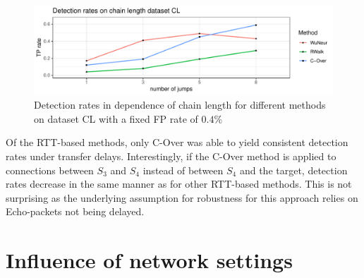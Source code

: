 \documentclass[runningheads,11pt]{llncs}\usepackage[]{graphicx}\usepackage[]{color}
\makeatletter
\def\maxwidth{ %
  \ifdim\Gin@nat@width>\linewidth
    \linewidth
  \else
    \Gin@nat@width
  \fi
}
\newenvironment{knitrout}{}{} %
\makeatother
\begin{document}
\begin{knitrout}
\color{fgcolor}\begin{figure}
\includegraphics[width=\maxwidth]{figure/Influencechainl-1} \caption[Detection rates in dependence of chain length for different methods on dataset CL with a fixed FP rate of $0.4\%$]{Detection rates in dependence of chain length for different methods on dataset CL with a fixed FP rate of $0.4\%$}\label{fig:Influencechainl}
\end{figure}


\end{knitrout}


Of the RTT-based methods, only C-Over was able to yield consistent detection rates under transfer delays. 
Interestingly, if the C-Over method is applied to connections between $S_3$ and $S_4$ instead of between $S_4$ and the target, detection rates decrease in the same manner as for other RTT-based methods. This is not surprising as the underlying assumption for robustness for this approach relies on Echo-packets not being delayed.


\section{Influence of network settings}\label{Sec:InfluenceNetwork}
\end{document}
